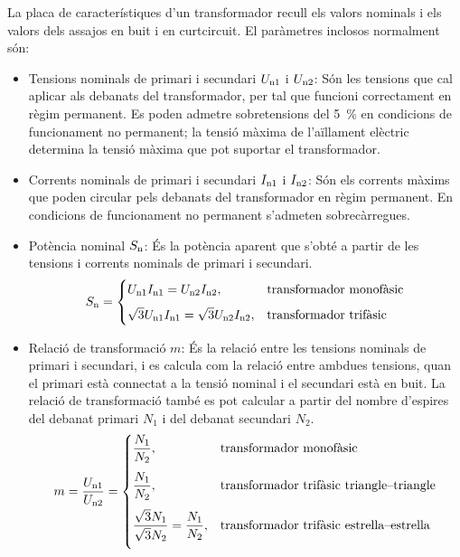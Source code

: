 La  placa de característiques d'un transformador recull els valors nominals  i els valors dels assajos
en buit i en curtcircuit. El paràmetres inclosos normalment són:
\begin{itemize}
   \item Tensions nominals de primari i secundari  $U_\mathrm{n1}$ i $U_\mathrm{n2}$: Són les tensions que cal aplicar als debanats del transformador, per tal que funcioni correctament en règim permanent. Es poden admetre sobretensions del \SI{5}{\percent} en condicions de funcionament no permanent; la tensió màxima de l'aïllament elèctric determina la tensió màxima que pot suportar el transformador.
   \item Corrents nominals de primari i secundari  $I_\mathrm{n1}$ i $I_\mathrm{n2}$: Són els corrents màxims que poden circular pels debanats del transformador en règim permanent. En condicions de funcionament no permanent s'admeten sobrecàrregues.
   \item Potència nominal $S_\mathrm{n}$: És la potència aparent que s'obté a partir de les tensions i corrents nominals de primari i secundari.
       \begin{equation}
        S_\mathrm{n} = \begin{cases} U_\mathrm{n1} I_\mathrm{n1} = U_\mathrm{n2} I_\mathrm{n2}, & \text{transformador monofàsic} \\[2mm]
        \sqrt{3} U_\mathrm{n1} I_\mathrm{n1} = \sqrt{3} U_\mathrm{n2} I_\mathrm{n2}, & \text{transformador trifàsic} \end{cases}
       \end{equation}
   \item Relació de transformació $m$: És la relació entre les tensions nominals de primari i secundari, i es calcula com la relació entre ambdues tensions, quan el primari està connectat a la tensió nominal i el secundari està en buit. La relació de  transformació també es pot calcular a partir del nombre d'espires del debanat primari $N_1$ i del debanat secundari $N_2$.
       \begin{equation}
        m = \frac{U_\mathrm{n1}}{U_\mathrm{n2}} =  \begin{cases}
        \dfrac{N_1}{N_2}, & \text{transformador monofàsic} \\[0.4cm]
        \dfrac{N_1}{N_2}, & \text{transformador trifàsic triangle--triangle} \\[0.4cm]
        \dfrac{\sqrt{3}N_1}{\sqrt{3}N_2} = \dfrac{N_1}{N_2}, & \text{transformador trifàsic estrella--estrella} \\[0.4cm]

\end{cases}
\end{equation}
\end{itemize}
